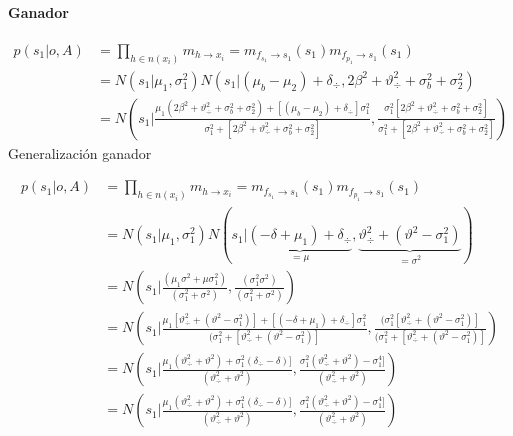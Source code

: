\documentclass[11pt,twoside,spanish]{report} %
\begin{document}
\paragraph{Ganador}
\begin{equation}
	\begin{split}
		p(s_1|o,A) &= \prod_{h \in n(x_i)} m_{h \rightarrow x_i} = m_{f_{s_1} \rightarrow s_1}(s_1) m_{f_{p_1} \rightarrow s_1}(s_1) \\
		&=  N(s_1| \mu_1, \sigma_1^2)  N( s_1|(\mu_b - \mu_2) + \delta_{\div} , 2\beta^2+\vartheta_{\div}^2 + \sigma_b^2 + \sigma_2^2) \\
		&=  N\left(s_1|\frac{\mu_1(2\beta^2+\vartheta_{\div}^2 + \sigma_b^2 + \sigma_2^2)+ [(\mu_b - \mu_2) + \delta_{\div}]\sigma_1^2}{\sigma_1^2+[2\beta^2+\vartheta_{\div}^2 + \sigma_b^2 + \sigma_2^2]}, \frac{\sigma_1^2[2\beta^2+\vartheta_{\div}^2 + \sigma_b^2 + \sigma_2^2]}{\sigma_1^2+[2\beta^2+\vartheta_{\div}^2 + \sigma_b^2 + \sigma_2^2]}\right)
	\end{split}
\end{equation}
Generalizaci\'on ganador

\begin{equation}
	\begin{split}
		p(s_1|o,A) &= \prod_{h \in n(x_i)} m_{h \rightarrow x_i} = m_{f_{s_1} \rightarrow s_1}(s_1) m_{f_{p_1} \rightarrow s_1}(s_1) \\
		&=  N(s_1| \mu_1, \sigma_1^2)   N( s_1| \underbrace{(-\delta + \mu_1) + \delta_{\div}}_{=\mu} ,\underbrace{\vartheta_{\div}^2 + (\vartheta^2 - \sigma_1^2 )}_{=\sigma^2})  \\
		&=  N\left(s_1|\frac{(\mu_1\sigma^2+\mu\sigma_1^2)}{(\sigma_1^2+\sigma^2)}, \frac{(\sigma_1^2\sigma^2)}{(\sigma_1^2+\sigma^2)}\right)\\
		&= N\left(s_1\Big| \frac{\mu_1 [\vartheta_{\div}^2 + (\vartheta^2 - \sigma_1^2 )]+[(-\delta + \mu_1) + \delta_{\div}]\sigma_1^2}{(\sigma_1^2+[\vartheta_{\div}^2 + (\vartheta^2 - \sigma_1^2 )]},
		\frac{(\sigma_1^2[\vartheta_{\div}^2 + (\vartheta^2 - \sigma_1^2 )]}{(\sigma_1^2+[\vartheta_{\div}^2 + (\vartheta^2 - \sigma_1^2 )]}\right)\\
		&= N\left(s_1\Big| \frac{\mu_1 (\vartheta_{\div}^2 + \vartheta^2)+\sigma_1^2(\delta_{\div}-\delta)]}{(\vartheta_{\div}^2 + \vartheta^2 )},
		\frac{\sigma_1^2(\vartheta_{\div}^2 + \vartheta^2) - \sigma_1^4 ]}{(\vartheta_{\div}^2 + \vartheta^2)}\right)\\
		&= N\left(s_1\Big| \frac{\mu_1 (\vartheta_{\div}^2 + \vartheta^2)+\sigma_1^2(\delta_{\div}-\delta)]}{(\vartheta_{\div}^2 + \vartheta^2 )},
		\frac{\sigma_1^2(\vartheta_{\div}^2 + \vartheta^2) - \sigma_1^4 ]}{(\vartheta_{\div}^2 + \vartheta^2)}\right)
	\end{split}
\end{equation}
\end{document}
